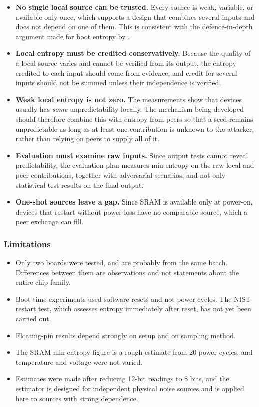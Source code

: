 \documentclass[a4paper, 12pt]{article}
\begin{document}
\begin{itemize}
    \item \textbf{No single local source can be trusted.} Every source is weak, variable, or available only once, which supports a design that combines several inputs and does not depend on one of them. This is consistent with the defence-in-depth argument made for boot entropy by \citet{blancoromero2026bootstrap}.
    \item \textbf{Local entropy must be credited conservatively.} Because the quality of a local source varies and cannot be verified from its output, the entropy credited to each input should come from evidence, and credit for several inputs should not be summed unless their independence is verified.
    \item \textbf{Weak local entropy is not zero.} The measurements show that devices usually has \emph{some} unpredictability locally. The mechanism being developed should therefore combine this with entropy from peers so that a seed remains unpredictable as long as at least one contribution is unknown to the attacker, rather than relying on peers to supply all of it.
    \item \textbf{Evaluation must examine raw inputs.} Since output tests cannot reveal predictability, the evaluation plan measures min-entropy on the raw local and peer contributions, together with adversarial scenarios, and not only statistical test results on the final output.
    \item \textbf{One-shot sources leave a gap.} Since SRAM is available only at power-on, devices that restart without power loss have no comparable source, which a peer exchange can fill.
\end{itemize}
 
\subsubsection{Limitations}
 
\begin{itemize}
    \item Only two boards were tested, and are probably from the same batch. Differences between them are observations and not statements about the entire chip family.
    \item Boot-time experiments used software resets and not power cycles. The NIST restart test, which assesses entropy immediately after reset, has not yet been carried out.
    \item Floating-pin results depend strongly on setup and on sampling method.
    \item The SRAM min-entropy figure is a rough estimate from 20 power cycles, and temperature and voltage were not varied.
    \item Estimates were made after reducing 12-bit readings to 8 bits, and the estimator is designed for independent physical noise sources and is applied here to sources with strong dependence.
\end{itemize}
 
\end{document}
